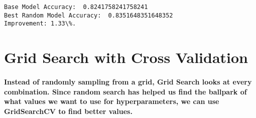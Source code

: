 \documentclass[11pt]{article}
\begin{document}
    \begin{Verbatim}[commandchars=\\\{\}]
Base Model Accuracy:  0.8241758241758241
Best Random Model Accuracy:  0.8351648351648352
Improvement: 1.33\%.

    \end{Verbatim}

    \section{Grid Search with Cross
Validation}\label{grid-search-with-cross-validation}

    \paragraph{Instead of randomly sampling from a grid, Grid Search looks
at every combination. Since random search has helped us find the
ballpark of what values we want to use for hyperparameters, we can use
GridSearchCV to find better
values.}\label{instead-of-randomly-sampling-from-a-grid-grid-search-looks-at-every-combination.-since-random-search-has-helped-us-find-the-ballpark-of-what-values-we-want-to-use-for-hyperparameters-we-can-use-gridsearchcv-to-find-better-values.}
\end{document}
